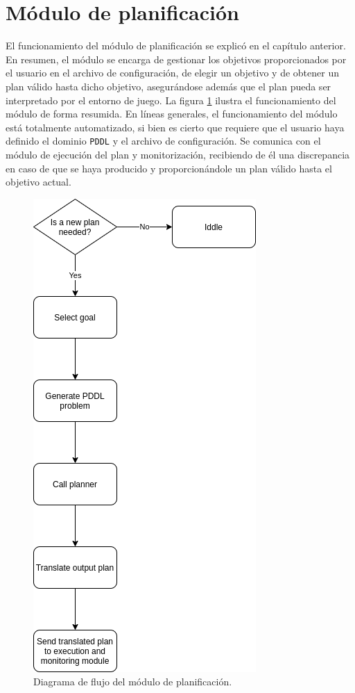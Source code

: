 \section{Módulo de planificación}

El funcionamiento del módulo de planificación se explicó en el capítulo anterior. En resumen, el
módulo se encarga de gestionar los objetivos proporcionados por el usuario en el archivo de
configuración, de elegir un objetivo y de obtener un plan válido hasta dicho objetivo, asegurándose
además que el plan pueda ser interpretado por el entorno de juego. La figura \ref{fig:flux-planning}
ilustra el funcionamiento del módulo de forma resumida. En líneas generales, el funcionamiento del módulo está
totalmente automatizado, si bien es cierto que requiere que el usuario haya definido el dominio \texttt{PDDL}
y el archivo de configuración. Se comunica con el módulo de ejecución del plan y monitorización,
recibiendo de él una discrepancia en caso de que se haya producido y proporcionándole un plan válido
hasta el objetivo actual.

\begin{figure}[H]
    \centering
    \includegraphics[scale=0.45]{img/CH05/flux_planning.png}
    \caption{Diagrama de flujo del módulo de planificación.}
    \label{fig:flux-planning}
\end{figure}

